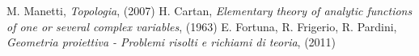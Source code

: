 \begin{thebibliography}{widest entry}
   M. Manetti, \textit{Topologia}, (2007)
   H. Cartan, \textit{Elementary theory of analytic functions of one or several complex variables}, (1963)
   E. Fortuna, R. Frigerio, R. Pardini, \textit{Geometria proiettiva - Problemi risolti e richiami di teoria}, (2011)
\end{thebibliography}
